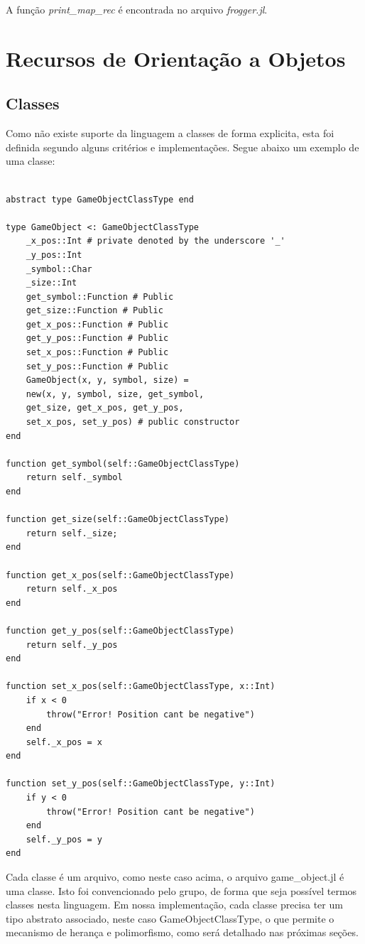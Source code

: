\documentclass[rel_mlp]{iiufrgs}
\begin{document}
    A função \textit{print\_map\_rec} é encontrada no arquivo \textit{frogger.jl}.
    
    
\chapter{Recursos de Orientação a Objetos}

\section{Classes}

Como não existe suporte da linguagem a classes de forma explicita, esta foi definida segundo alguns critérios e implementações. Segue abaixo um exemplo de uma classe:
    \begin{lstlisting}[frame=single]

abstract type GameObjectClassType end  

type GameObject <: GameObjectClassType
	_x_pos::Int # private denoted by the underscore '_'
	_y_pos::Int 
	_symbol::Char 
	_size::Int 
	get_symbol::Function # Public
	get_size::Function # Public
	get_x_pos::Function # Public
	get_y_pos::Function # Public
	set_x_pos::Function # Public
	set_y_pos::Function # Public
	GameObject(x, y, symbol, size) = 
	new(x, y, symbol, size, get_symbol,
	get_size, get_x_pos, get_y_pos,
	set_x_pos, set_y_pos) # public constructor
end

function get_symbol(self::GameObjectClassType)
	return self._symbol
end

function get_size(self::GameObjectClassType)
    return self._size;
end

function get_x_pos(self::GameObjectClassType)
	return self._x_pos
end

function get_y_pos(self::GameObjectClassType)
	return self._y_pos
end

function set_x_pos(self::GameObjectClassType, x::Int)
	if x < 0
		throw("Error! Position cant be negative")
	end	
	self._x_pos = x
end

function set_y_pos(self::GameObjectClassType, y::Int)
	if y < 0
		throw("Error! Position cant be negative")
	end	
	self._y_pos = y
end

\end{lstlisting}
    
Cada classe é um arquivo, como neste caso acima, o arquivo game\_object.jl é uma classe. Isto foi convencionado pelo grupo, de forma que seja possível termos classes nesta linguagem. Em nossa implementação, cada classe precisa ter um tipo abstrato associado, neste caso GameObjectClassType, o que permite o mecanismo de herança e polimorfismo, como será detalhado nas próximas seções.
\end{document}
